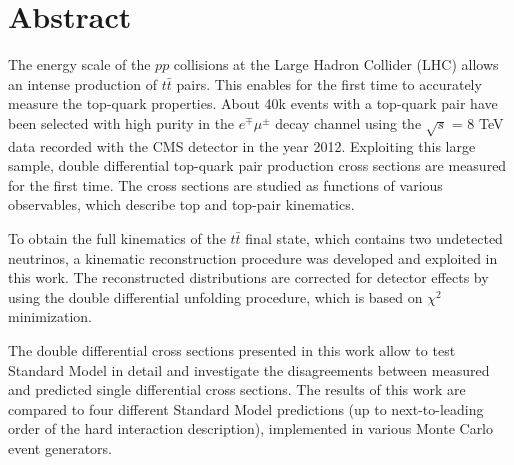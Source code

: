 \thispagestyle{empty}
\vspace{-3cm}
\section*{\centering Abstract}

\vspace{\baselineskip}

The energy scale of the $pp$ collisions at the Large Hadron Collider (LHC) allows an intense
production of $t\bar{t}$ pairs. This enables for the first time to accurately measure the top-quark 
properties. About 40k events with a top-quark pair have been selected with high purity in the 
$e^{\mp}\mu^{\pm}$ decay channel using the $\sqrt{s}$ = 8 TeV data recorded with the CMS detector 
in the year 2012. Exploiting this large sample, double differential top-quark pair production 
cross sections are measured for the first time. The cross sections are studied as functions of
various observables, which describe top and top-pair kinematics. 

To obtain the full kinematics of the $t\bar{t}$ final state, which contains two undetected neutrinos,
a kinematic reconstruction procedure was developed and exploited in this work. The reconstructed distributions
are corrected for detector effects by using the double differential unfolding procedure, which is
based on $\chi^{2}$ minimization.

The double differential cross sections presented in this work allow to test Standard Model 
in detail and investigate the disagreements between measured and predicted single differential cross sections.
The results of this work are compared to four different Standard Model predictions (up to next-to-leading order
of the hard interaction description), implemented in various Monte Carlo event generators.

